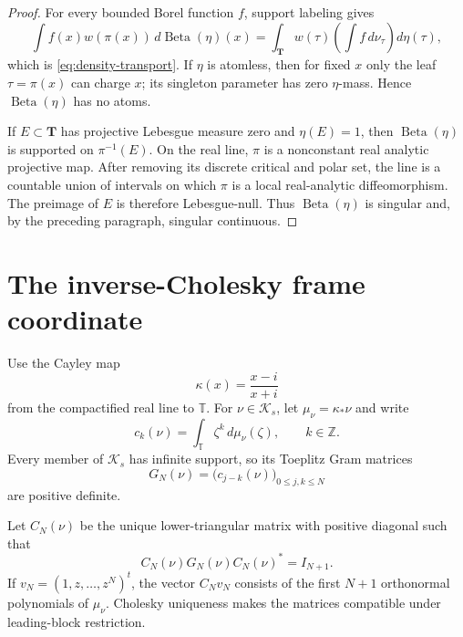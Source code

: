 \documentclass[11pt]{article}
\newcommand{\T}{\mathbb T}
\newcommand{\cK}{\mathcal K}
\newcommand{\Beta}{\operatorname{Beta}}
\begin{document}
\begin{proof}
For every bounded Borel function $f$, support labeling gives
\[
 \int f(x)w(\pi(x))\,d\Beta(\eta)(x)
 =\int_{\mathbf T}w(\tau)\left(\int f\,d\nu_\tau\right)d\eta(\tau),
\]
which is \eqref{eq:density-transport}.  If $\eta$ is atomless, then for fixed $x$ only the leaf
$\tau=\pi(x)$ can charge $x$; its singleton parameter has zero $\eta$-mass.  Hence
$\Beta(\eta)$ has no atoms.

If $E\subset\mathbf T$ has projective Lebesgue measure zero and $\eta(E)=1$, then
$\Beta(\eta)$ is supported on $\pi^{-1}(E)$.  On the real line, $\pi$ is a nonconstant real
analytic projective map.  After removing its discrete critical and polar set, the line is a
countable union of intervals on which $\pi$ is a local real-analytic diffeomorphism.  The preimage
of $E$ is therefore Lebesgue-null.  Thus $\Beta(\eta)$ is singular and, by the preceding paragraph,
singular continuous.
\end{proof}

\section{The inverse-Cholesky frame coordinate}\label{sec:frame}

Use the Cayley map
\begin{equation}\label{eq:cayley}
  \kappa(x)=\frac{x-i}{x+i}
\end{equation}
from the compactified real line to $\T$.  For $\nu\in\cK_s$, let
$\mu_\nu=\kappa_*\nu$ and write
\begin{equation}\label{eq:circle-moments}
  c_k(\nu)=\int_{\T}\zeta^k\,d\mu_\nu(\zeta),\qquad k\in\mathbb Z.
\end{equation}
Every member of $\cK_s$ has infinite support, so its Toeplitz Gram matrices
\begin{equation}\label{eq:gram}
  G_N(\nu)=\bigl(c_{j-k}(\nu)\bigr)_{0\leq j,k\leq N}
\end{equation}
are positive definite.

Let $C_N(\nu)$ be the unique lower-triangular matrix with positive diagonal such that
\begin{equation}\label{eq:cholesky}
  C_N(\nu)G_N(\nu)C_N(\nu)^*=I_{N+1}.
\end{equation}
If $v_N=(1,z,\ldots,z^N)^t$, the vector $C_Nv_N$ consists of the first $N+1$
orthonormal polynomials of $\mu_\nu$.  Cholesky uniqueness makes the matrices compatible under
leading-block restriction.
\end{document}
